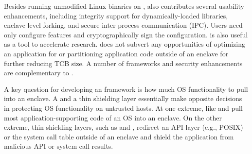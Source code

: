 Besides running unmodified Linux binaries on \sgx{}, \graphenesgx{} also contributes several usability enhancements,
including integrity support for dynamically-loaded libraries, enclave-level forking, and secure inter-process communication (IPC).
Users need only configure features and cryptographically sign the configuration.
\graphenesgx{} is also useful as a tool to accelerate \sgx{} research.
\graphenesgx{} does not subvert
any opportunities of optimizing an application for \sgx{} or partitioning application code outside of an enclave for further reducing TCB size.
A number of \sgx{} frameworks and security enhancements~\cite{orenbach17eleos,kuvaiskii17sgxbound,shih2017t-sgx,seo2017sgx-shield} are complementary to \graphenesgx{}. 



\label{sec:sgx:background:shielding}


A key question for developing an \sgx{} framework is how much OS functionality to pull into an enclave.
A \libos{} and a thin shielding layer essentially make opposite decisions
in protecting OS functionality on untrusted hosts.
At one extreme, \liboses{} like \graphenesgx{} and \haven{} pull most
application-supporting code of an OS into an enclave.
On the other extreme, thin shielding layers, such as \scone{} and \panoply{}, redirect
an API layer (e.g., POSIX) or the system call table
outside of an enclave and shield the application from malicious API or system call results.



